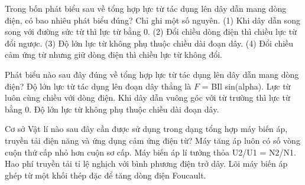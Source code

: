 \begin{ex}
Trong bốn phát biểu sau về tổng hợp lực từ tác dụng lên dây dẫn mang dòng điện, có bao nhiêu phát biểu đúng? Chỉ ghi một số nguyên. (1) Khi dây dẫn song song với đường sức từ thì lực từ bằng 0. (2) Đổi chiều dòng điện thì chiều lực từ đổi ngược. (3) Độ lớn lực từ không phụ thuộc chiều dài đoạn dây. (4) Đổi chiều cảm ứng từ nhưng giữ dòng điện thì chiều lực từ không đổi.
\end{ex}

\begin{ex}
Phát biểu nào sau đây đúng về tổng hợp lực từ tác dụng lên dây dẫn mang dòng điện?
\choice
{\True Độ lớn lực từ tác dụng lên đoạn dây thẳng là $F$ = BIl sin(alpha).}
{Lực từ luôn cùng chiều với dòng điện.}
{Khi dây dẫn vuông góc với từ trường thì lực từ bằng 0.}
{Độ lớn lực từ không phụ thuộc chiều dài đoạn dây.}
\end{ex}

\begin{ex}
Cơ sở Vật lí nào sau đây cần được sử dụng trong dạng tổng hợp máy biến áp, truyền tải điện năng và ứng dụng cảm ứng điện từ?
\choice
{Máy tăng áp luôn có số vòng cuộn thứ cấp nhỏ hơn cuộn sơ cấp.}
{\True Máy biến áp lí tưởng thỏa U2/U1 = N2/N1.}
{Hao phí truyền tải tỉ lệ nghịch với bình phương điện trở dây.}
{Lõi máy biến áp ghép từ một khối thép đặc để tăng dòng điện Foucault.}
\end{ex}

